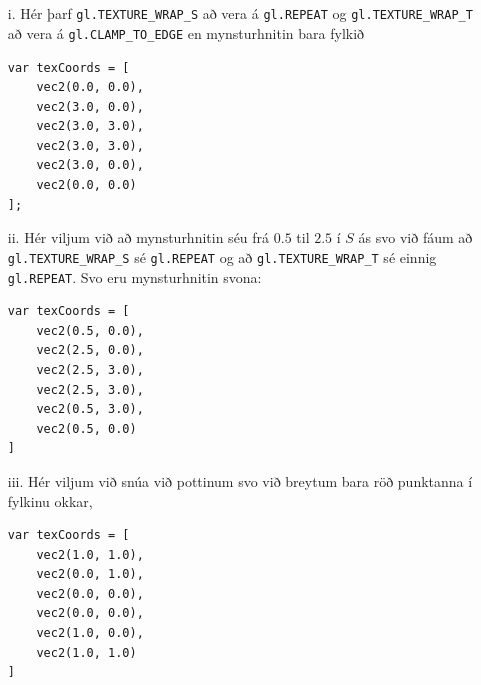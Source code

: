 \documentclass{article}
\begin{document}
	\newpage
	\section{}
	\begin{itemize}
		\item[i.] Hér þarf \texttt{gl.TEXTURE\_WRAP\_S} að vera á 
			\texttt{gl.REPEAT} og \texttt{gl.TEXTURE\_WRAP\_T} að vera 
			á \texttt{gl.CLAMP\_TO\_EDGE} en mynsturhnitin bara fylkið
			\begin{verbatim}
var texCoords = [
    vec2(0.0, 0.0),
    vec2(3.0, 0.0),
    vec2(3.0, 3.0),
    vec2(3.0, 3.0),
    vec2(3.0, 0.0),
    vec2(0.0, 0.0)
];
			\end{verbatim}
		\item[ii.] Hér viljum við að mynsturhnitin séu frá $0.5$ til $2.5$ 
			í $S$ ás svo við fáum að \\ \texttt{gl.TEXTURE\_WRAP\_S} sé 
			\texttt{gl.REPEAT} og að \texttt{gl.TEXTURE\_WRAP\_T} sé einnig 
			\texttt{gl.REPEAT}. Svo eru mynsturhnitin svona:
			\begin{verbatim}
var texCoords = [
    vec2(0.5, 0.0),
    vec2(2.5, 0.0),
    vec2(2.5, 3.0),
    vec2(2.5, 3.0),
    vec2(0.5, 3.0),
    vec2(0.5, 0.0)
]
			\end{verbatim}
		\item[iii.] Hér viljum við snúa við pottinum svo við breytum bara 
			röð punktanna í fylkinu okkar,
			\begin{verbatim}
var texCoords = [
    vec2(1.0, 1.0),
    vec2(0.0, 1.0),
    vec2(0.0, 0.0),
    vec2(0.0, 0.0),
    vec2(1.0, 0.0),
    vec2(1.0, 1.0)
]
			\end{verbatim}
	\end{itemize}
\end{document}
